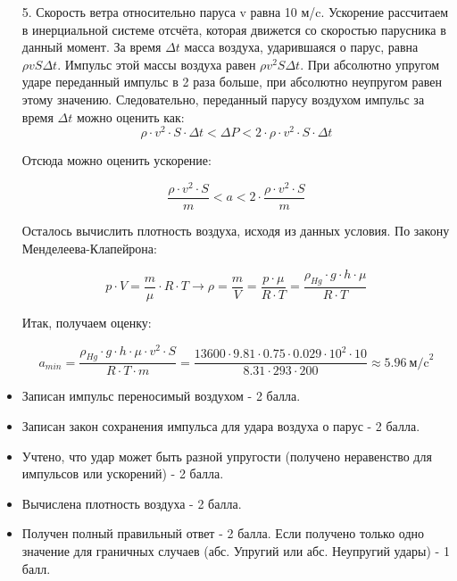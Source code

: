 \begin{enumerate}
    \item[5.] Скорость ветра относительно паруса v равна 10 м/c. Ускорение рассчитаем в инерциальной системе 
    отсчёта, которая движется со скоростью парусника в данный момент. За время $\Delta t$ 
    масса воздуха, ударившаяся о парус, равна $\rho vS \Delta t$. 
    Импульс этой массы воздуха равен $\rho v^2S \Delta t$. 
    При абсолютно упругом ударе переданный импульс в 2 
    раза больше, при абсолютно неупругом равен этому 
    значению. Следовательно, переданный парусу воздухом 
    импульс за время $\Delta t$ можно оценить как:
    $$\rho \cdot v^2\cdot S\cdot \Delta t< \Delta P<2\cdot \rho \cdot v^2\cdot S\cdot \Delta t$$
    
    Отсюда можно оценить ускорение:
    
    $$\frac{\rho \cdot v^2\cdot S}{m}< a<2\cdot \frac{\rho \cdot v^2\cdot S}{m}$$
    
    Осталось вычислить плотность воздуха, исходя из данных условия. По закону Менделеева-Клапейрона:
    
    $$p\cdot V=\frac{m}{\mu} \cdot R\cdot T \rightarrow  \rho =\frac{m}{V}=\frac{p\cdot \mu}{R\cdot T}=\frac{\rho_{Hg}\cdot g\cdot h\cdot \mu}{R\cdot T}$$
    
    Итак, получаем оценку: 
    
    $$a_{min}=\frac{\rho_{Hg}\cdot g\cdot h\cdot \mu\cdot v^2\cdot S}{R\cdot T\cdot m}=\frac{13600\cdot 9.81\cdot 0.75\cdot 0.029\cdot 10^2\cdot 10}{8.31\cdot 293\cdot 200} \approx 5.96 \: \text{м/c}^2$$
    
\end{enumerate}

\additionalCriteria

\begin{itemize}
    \item Записан импульс переносимый воздухом - 2 балла.
    \item Записан закон сохранения импульса для удара воздуха о парус - 2 балла.
    \item Учтено, что удар может быть разной упругости  (получено неравенство для импульсов или ускорений) - 2 балла.
    \item Вычислена плотность воздуха - 2 балла.
    \item Получен полный правильный ответ - 2 балла. Если получено только одно значение для граничных случаев (абс. Упругий или абс. Неупругий удары) - 1 балл.   
\end{itemize}